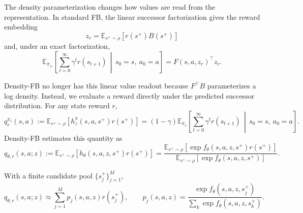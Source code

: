 \documentclass[11pt]{article}
\begin{document}
The density parameterization changes how values are read from the representation. In standard FB, the linear successor factorization gives the reward embedding
\[
    z_r=\mathbb E_{s^+\sim\rho}\left[r(s^+)B(s^+)\right]
\]
and, under an exact factorization,
\begin{equation}
    \mathbb E_{\pi_{z_r}}
    \left[
        \sum_{t=0}^{\infty}\gamma^t r(s_{t+1})
        \,\middle|\,
        s_0=s,\ a_0=a
    \right]
    =
    F(s,a,z_r)^\top z_r.
    \label{eq:standard-fb-value}
\end{equation}

Density-FB no longer has this linear value readout because $F^\top B$ parameterizes a log density. Instead, we evaluate a reward directly under the predicted successor distribution. For any state reward $r$,
\begin{equation}
    q_r^{\pi_z}(s,a)
    :=
    \mathbb E_{s^+\sim\rho}
    \left[
        h_z^\pi(s,a,s^+)r(s^+)
    \right]
    =
    (1-\gamma)
    \mathbb E_{\pi_z}
    \left[
        \sum_{t=0}^{\infty}\gamma^t r(s_{t+1})
        \,\middle|\,
        s_0=s,\ a_0=a
    \right].
    \label{eq:true-normalized-value}
\end{equation}
Density-FB estimates this quantity as
\begin{equation}
    q_{\theta,r}(s,a;z)
    :=
    \mathbb E_{s^+\sim\rho}
    \left[
        h_\theta(s,a,z,s^+)r(s^+)
    \right]
    =
    \frac{
        \mathbb E_{s^+\sim\rho}
        \left[
            \exp f_\theta(s,a,z,s^+)r(s^+)
        \right]
    }{
        \mathbb E_{s^+\sim\rho}
        \left[
            \exp f_\theta(s,a,z,s^+)
        \right]
    }.
    \label{eq:model-reward-value}
\end{equation}

With a finite candidate pool $\{s_j^+\}_{j=1}^{M}$,
\begin{equation}
    q_{\theta,r}(s,a;z)
    \approx
    \sum_{j=1}^{M}
    p_j(s,a,z)r(s_j^+),
    \qquad
    p_j(s,a,z)
    =
    \frac{
        \exp f_\theta(s,a,z,s_j^+)
    }{
        \sum_k\exp f_\theta(s,a,z,s_k^+)
    }.
    \label{eq:finite-reward-value}
\end{equation}
\end{document}
